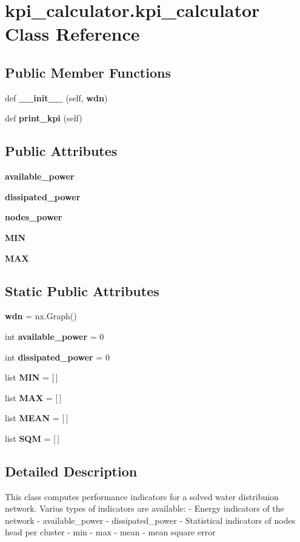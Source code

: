 \section{kpi\+\_\+calculator.\+kpi\+\_\+calculator Class Reference}
\label{classkpi__calculator_1_1kpi__calculator}
\subsection*{Public Member Functions}
\begin{DoxyCompactItemize}
\item 
def \textbf{ \+\_\+\+\_\+init\+\_\+\+\_\+} (self, \textbf{ wdn})
\item 
def \textbf{ print\+\_\+kpi} (self)
\end{DoxyCompactItemize}
\subsection*{Public Attributes}
\begin{DoxyCompactItemize}
\item 
\textbf{ available\+\_\+power}
\item 
\textbf{ dissipated\+\_\+power}
\item 
\textbf{ nodes\+\_\+power}
\item 
\textbf{ M\+IN}
\item 
\textbf{ M\+AX}
\end{DoxyCompactItemize}
\subsection*{Static Public Attributes}
\begin{DoxyCompactItemize}
\item 
\textbf{ wdn} = nx.\+Graph()
\item 
int \textbf{ available\+\_\+power} = 0
\item 
int \textbf{ dissipated\+\_\+power} = 0
\item 
list \textbf{ M\+IN} = [$\,$]
\item 
list \textbf{ M\+AX} = [$\,$]
\item 
list \textbf{ M\+E\+AN} = [$\,$]
\item 
list \textbf{ S\+QM} = [$\,$]
\end{DoxyCompactItemize}


\subsection{Detailed Description}
\begin{DoxyVerb}This class computes performance indicators for a solved water distribuion network.
Varius types of indicators are available:
- Energy indicators of the network
    - available_power
    - dissipated_power
- Statistical indicators of nodes head per cluster
    - min
    - max
    - mean
    - mean square error
\end{DoxyVerb}
 

